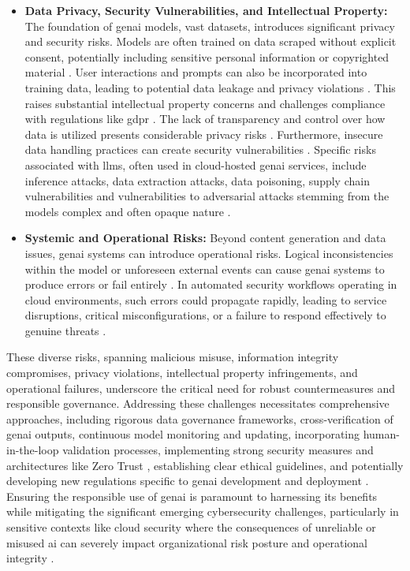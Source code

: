 \begin{itemize}
\item \textbf{Data Privacy, Security Vulnerabilities, and Intellectual Property:} The foundation of \gls{genai} models, vast datasets, introduces significant privacy and security risks. Models are often trained on data scraped without explicit consent, potentially including sensitive personal information or copyrighted material \cite{nyoto_cyber_2024}. User interactions and prompts can also be incorporated into training data, leading to potential data leakage and privacy violations \cite{nyoto_cyber_2024}. This raises substantial intellectual property concerns and challenges compliance with regulations like \gls{gdpr} \cite{nyoto_cyber_2024}. The lack of transparency and control over how data is utilized presents considerable privacy risks \cite{nyoto_cyber_2024}. Furthermore, insecure data handling practices can create security vulnerabilities \cite{surathunmanun_exploring_2024}. Specific risks associated with \glspl{llm}, often used in cloud-hosted \gls{genai} services, include inference attacks, data extraction attacks, data poisoning, supply chain vulnerabilities \cite{surathunmanun_exploring_2024} and vulnerabilities to adversarial attacks stemming from the models complex and often opaque nature \cite{dash_zero-trust_2024}.

\item \textbf{Systemic and Operational Risks:} Beyond content generation and data issues, \gls{genai} systems can introduce operational risks. Logical inconsistencies within the model or unforeseen external events can cause \gls{genai} systems to produce errors or fail entirely \cite{surathunmanun_exploring_2024}. In automated security workflows operating in cloud environments, such errors could propagate rapidly, leading to service disruptions, critical misconfigurations, or a failure to respond effectively to genuine threats \cite{surathunmanun_exploring_2024}.
\end{itemize}

These diverse risks, spanning malicious misuse, information integrity compromises, privacy violations, intellectual property infringements, and operational failures, underscore the critical need for robust countermeasures and responsible governance. Addressing these challenges necessitates comprehensive approaches, including rigorous data governance frameworks, cross-verification of \gls{genai} outputs, continuous model monitoring and updating, incorporating human-in-the-loop validation processes, implementing strong security measures \cite{surathunmanun_exploring_2024} and architectures like Zero Trust \cite{surathunmanun_exploring_2024, dash_zero-trust_2024}, establishing clear ethical guidelines, and potentially developing new regulations specific to \gls{genai} development and deployment \cite{nyoto_cyber_2024}. Ensuring the responsible use of \gls{genai} is paramount to harnessing its benefits while mitigating the significant emerging cybersecurity challenges, particularly in sensitive contexts like cloud security where the consequences of unreliable or misused \gls{ai} can severely impact organizational risk posture and operational integrity \cite{surathunmanun_exploring_2024}.

